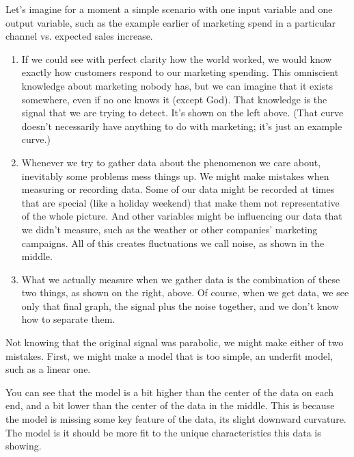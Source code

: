 \documentclass[letterpaper,10pt,english]{sphinxmanual}
\begin{document}
Let’s imagine for a moment a simple scenario with one input variable and one output variable, such as the example earlier of marketing spend in a particular channel vs. expected sales increase.
\begin{enumerate}
%
\item {} 
If we could see with perfect clarity how the world worked, we would know exactly how customers respond to our marketing spending.  This omniscient knowledge about marketing nobody has, but we can imagine that it exists somewhere, even if no one knows it (except God).  That knowledge is the signal that we are trying to detect.  It’s shown on the left above.  (That curve doesn’t necessarily have anything to do with marketing; it’s just an example curve.)

\item {} 
Whenever we try to gather data about the phenomenon we care about, inevitably some problems mess things up.  We might make mistakes when measuring or recording data.  Some of our data might be recorded at times that are special (like a holiday weekend) that make them not representative of the whole picture.  And other variables might be influencing our data that we didn’t measure, such as the weather or other companies’ marketing campaigns.  All of this creates fluctuations we call noise, as shown in the middle.

\item {} 
What we actually measure when we gather data is the combination of these two things, as shown on the right, above.  Of course, when we get data, we see only that final graph, the signal plus the noise together, and we don’t know how to separate them.

\end{enumerate}

Not knowing that the original signal was parabolic, we might make either of two mistakes.  First, we might make a model that is too simple, an underfit model, such as a linear one.


You can see that the model is a bit higher than the center of the data on each end, and a bit lower than the center of the data in the middle.  This is because the model is missing some key feature of the data, its slight downward curvature.  The model is  it should be more fit to the unique characteristics this data is showing.
\end{document}
